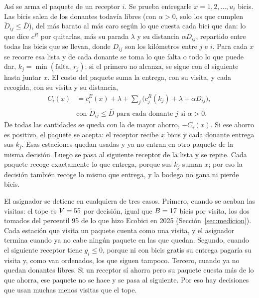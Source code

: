 \documentclass[conference,letterpaper,10pt]{IEEEtran}
\begin{document}
Así se arma el paquete de un receptor $i$. Se prueba entregarle $x=1,2,\dots,u_i$ bicis. Las bicis salen de los donantes todavía libres (con $\alpha>0$, solo los que cumplen $\tilde D_{ij}\le\bar D$), del más barato al más caro según lo que cuesta cada bici que dan: lo que dice $c^R$ por quitarlas, más su parada $\lambda$ y su distancia $\alpha D_{ij}$, repartido entre todas las bicis que se llevan, donde $D_{ij}$ son los kilómetros entre $j$ e $i$. Para cada $x$ se recorre esa lista y de cada donante se toma lo que falta o todo lo que puede dar, $k_j=\min(\text{falta},\,r_j)$; si el primero no alcanza, se sigue con el siguiente hasta juntar $x$. El costo del paquete suma la entrega, con su visita, y cada recogida, con su visita y su distancia,
\begin{equation}\label{eq:paquete}
\begin{aligned}
C_i(x)&=c^E_i(x)+\lambda+\textstyle\sum_{j}\bigl(c^R_j(k_j)+\lambda+\alpha D_{ij}\bigr),\\
&\text{con } \tilde D_{ij}\le\bar D \text{ para cada donante } j \text{ si } \alpha>0.
\end{aligned}
\end{equation}
De todas las cantidades se queda con la de mayor ahorro, $-C_i(x)$. Si ese ahorro es positivo, el paquete se acepta: el receptor recibe $x$ bicis y cada donante entrega sus $k_j$. Esas estaciones quedan usadas y ya no entran en otro paquete de la misma decisión. Luego se pasa al siguiente receptor de la lista y se repite. Cada paquete recoge exactamente lo que entrega, porque sus $k_j$ suman $x$; por eso la decisión también recoge lo mismo que entrega, y la bodega no gana ni pierde bicis.

El asignador se detiene en cualquiera de tres casos. Primero, cuando se acaban las visitas: el tope es $V=55$ por decisión, igual que $B=17$ bicis por visita, los dos tomados del percentil 95 de lo que hizo Ecobici en 2025 (Sección~\ref{sec:medicion}). Cada estación que visita un paquete cuenta como una visita, y el asignador termina cuando ya no cabe ningún paquete en las que quedan. Segundo, cuando el siguiente receptor tiene $g_i\le0$, porque ni con bicis gratis su entrega pagaría su visita y, como van ordenados, los que siguen tampoco. Tercero, cuando ya no quedan donantes libres. Si un receptor sí ahorra pero su paquete cuesta más de lo que ahorra, ese paquete no se hace y se pasa al siguiente. Por eso hay decisiones que usan muchas menos visitas que el tope.
\end{document}

